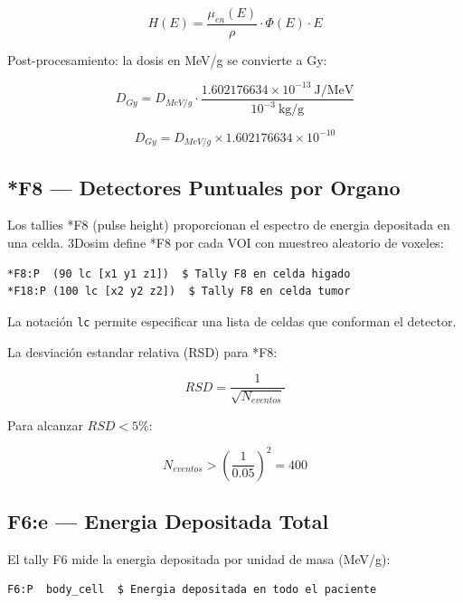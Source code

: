 \documentclass[12pt,a4paper]{article}
\begin{document}
$$
H(E) = \frac{\mu_{en}(E)}{\rho} \cdot \Phi(E) \cdot E
$$


Post-procesamiento: la dosis en MeV/g se convierte a Gy:

$$
D_{Gy} = D_{MeV/g} \cdot \frac{1.602176634 \times 10^{-13}\ \text{J/MeV}}{10^{-3}\ \text{kg/g}}
$$

$$
D_{Gy} = D_{MeV/g} \times 1.602176634 \times 10^{-10}
$$


\subsection{*F8 --- Detectores Puntuales por Organo}

Los tallies *F8 (pulse height) proporcionan el espectro de energia depositada en una celda. 3Dosim define *F8 por cada VOI con muestreo aleatorio de voxeles:

\begin{lstlisting}
*F8:P  (90 lc [x1 y1 z1])  $ Tally F8 en celda higado
*F18:P (100 lc [x2 y2 z2])  $ Tally F8 en celda tumor
\end{lstlisting}

La notación \texttt{lc} permite especificar una lista de celdas que conforman el detector.

La desviación estandar relativa (RSD) para *F8:

$$
RSD = \frac{1}{\sqrt{N_{eventos}}}
$$


Para alcanzar $RSD < 5\%$:

$$
N_{eventos} > \left(\frac{1}{0.05}\right)^2 = 400
$$

\subsection{F6:e --- Energia Depositada Total}

El tally F6 mide la energia depositada por unidad de masa (MeV/g):

\begin{lstlisting}
F6:P  body_cell  $ Energia depositada en todo el paciente
\end{lstlisting}
\end{document}
